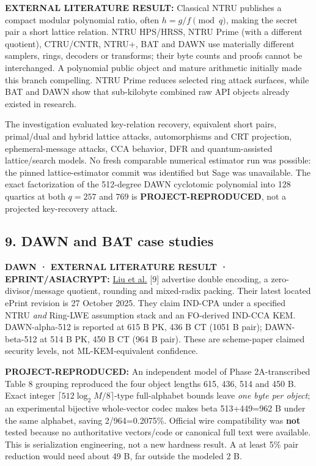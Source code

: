 \documentclass[
  10pt,
  a4paper,
]{article}
\begin{document}
\textbf{EXTERNAL LITERATURE RESULT:} Classical NTRU publishes a compact
modular polynomial ratio, often \(h=g/f\pmod q\), making the secret pair
a short lattice relation. NTRU HPS/HRSS, NTRU Prime (with a different
quotient), CTRU/CNTR, NTRU+, BAT and DAWN use materially different
samplers, rings, decoders or transforms; their byte counts and proofs
cannot be interchanged. A polynomial public object and mature arithmetic
initially made this branch compelling. NTRU Prime reduces selected ring
attack surfaces, while BAT and DAWN show that sub-kilobyte combined raw
API objects already existed in research.

The investigation evaluated key-relation recovery, equivalent short
pairs, primal/dual and hybrid lattice attacks, automorphisms and CRT
projection, ephemeral-message attacks, CCA behavior, DFR and
quantum-assisted lattice/search models. No fresh comparable numerical
estimator run was possible: the pinned lattice-estimator commit was
identified but Sage was unavailable. The exact factorization of the
512-degree DAWN cyclotomic polynomial into 128 quartics at both
\(q=257\) and \(769\) is \textbf{PROJECT-REPRODUCED}, not a projected
key-recovery attack.

\hypertarget{dawn-and-bat-case-studies}{%
\subsection{9. DAWN and BAT case
studies}\label{dawn-and-bat-case-studies}}

\textbf{DAWN · EXTERNAL LITERATURE RESULT · EPRINT/ASIACRYPT:}
\href{https://eprint.iacr.org/2025/1520}{Liu et al.} {[}9{]} advertise
double encoding, a zero-divisor/message quotient, rounding and
mixed-radix packing. Their latest located ePrint revision is 27 October
2025. They claim IND-CPA under a specified NTRU \emph{and} Ring-LWE
assumption stack and an FO-derived IND-CCA KEM. DAWN-alpha-512 is
reported at 615 B PK, 436 B CT (1051 B pair); DAWN-beta-512 at 514 B PK,
450 B CT (964 B pair). These are scheme-paper claimed security levels,
not ML-KEM-equivalent confidence.

\textbf{PROJECT-REPRODUCED:} An independent model of Phase
2A-transcribed Table 8 grouping reproduced the four object lengths 615,
436, 514 and 450 B. Exact integer \(\lceil512\log_2 M/8\rceil\)-type
full-alphabet bounds leave \emph{one byte per object}; an experimental
bijective whole-vector codec makes beta 513+449=962 B under the same
alphabet, saving 2/964=0.2075\%. Official wire compatibility was
\textbf{not} tested because no authoritative vectors/code or canonical
full text were available. This is serialization engineering, not a new
hardness result. A at least 5\% pair reduction would need about 49 B,
far outside the modeled 2 B.
\end{document}
